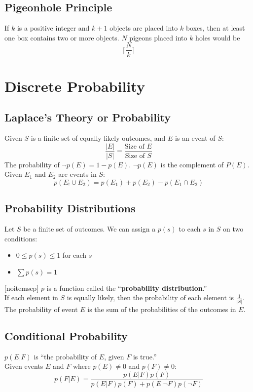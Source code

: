 \documentclass[letter]{article}
\begin{document}
\begin{multicols}{2}
  \subsection{Pigeonhole Principle}\noindent
  If $k$ is a positive integer and $k + 1$ objects are placed into $k$ boxes,
  then at least one box contains two or more objects. $N$ pigeons placed into
  $k$ holes would be
  $$\lceil\dfrac{N}{k}\rceil$$

  \section{Discrete Probability}\noindent

  \subsection{Laplace's Theory or Probability}\noindent
  Given $S$ is a finite set of equally likely outcomes, and $E$ is an event of
  $S$:
  $$\frac{|E|}{|S|} = \frac{\text{Size of } E}{\text{Size of } S}$$
  The probability of $\neg p(E) = 1 - p(E)$. $\neg p(E)$ is the complement of
  $P(E)$. \\
  Given $E_1$ and $E_2$ are events in $S$:
  $$p(E_! \cup E_2) = p(E_1) + p(E_2) - p(E_1 \cap E_2)$$

  \subsection{Probability Distributions}\noindent
  Let $S$ be a finite set of outcomes. We can assign a $p(s)$ to each $s$ in $S$
  on two conditions:
  \begin{itemize}[noitemsep]
    \item $0 \leq p(s) \leq 1$ for each $s$
    \item $\sum{p(s)} = 1$
  \end{itemize}[noitemsep]
  $p$ is a function called the ``\textbf{probability distribution}.'' \\
  If each element in $S$ is equally likely, then the probability of each element
  is $\frac{1}{|S|}$. \\
  The probability of event $E$ is the sum of the probabilities of the outcomes in
  $E$.

  \subsection{Conditional Probability}\noindent
  $p(E|F)$ is ``the probability of $E$, given $F$ is true.'' \\
  Given events $E$ and $F$ where $p(E) \neq 0$ and $p(F) \neq 0$:
  $$p(F|E) = \frac{p(E|F)p(F)}{p(E|F)p(F) + p(E|\neg F)p(\neg F)}$$


\end{multicols}
\end{document}
